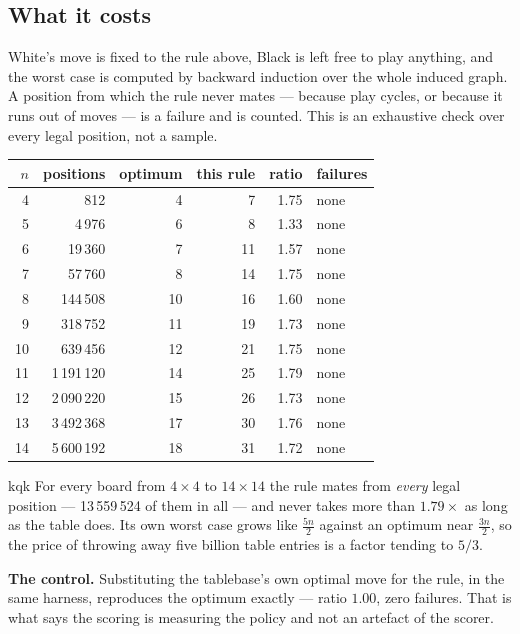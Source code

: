 \documentclass[11pt]{article}
\begin{document}
\subsection{What it costs}\label{sub:rule-cost}

White's move is fixed to the rule above, Black is left free to play anything,
and the worst case is computed by backward induction over the whole induced
graph. A position from which the rule never mates --- because play cycles, or
because it runs out of moves --- is a failure and is counted. This is an
exhaustive check over every legal position, not a sample.

\begin{center}\small
\begin{tabular}{@{}rrrrrl@{}}
\toprule
$n$ & \textbf{positions} & \textbf{optimum} & \textbf{this rule} &
\textbf{ratio} & \textbf{failures} \\
\midrule
 4 &         812 &  4 &  7 & 1.75 & none \\
 5 &     4\,976 &  6 &  8 & 1.33 & none \\
 6 &    19\,360 &  7 & 11 & 1.57 & none \\
 7 &    57\,760 &  8 & 14 & 1.75 & none \\
 8 &   144\,508 & 10 & 16 & 1.60 & none \\
 9 &   318\,752 & 11 & 19 & 1.73 & none \\
10 &   639\,456 & 12 & 21 & 1.75 & none \\
11 & 1\,191\,120 & 14 & 25 & 1.79 & none \\
12 & 2\,090\,220 & 15 & 26 & 1.73 & none \\
13 & 3\,492\,368 & 17 & 30 & 1.76 & none \\
14 & 5\,600\,192 & 18 & 31 & 1.72 & none \\
\bottomrule
\end{tabular}
\end{center}

\begin{result}[title={A rule that mates from everywhere, at most $1.79\times$ the optimum}]{kqk}
For every board from $4\times4$ to $14\times14$ the rule mates from
\emph{every} legal position --- 13\,559\,524 of them in all --- and never takes
more than $1.79\times$ as long as the table does. Its own worst case grows
like $\tfrac{5n}{2}$ against an optimum near $\tfrac{3n}{2}$, so the price of
throwing away five billion table entries is a factor tending to $5/3$.

\medskip
\textbf{The control.} Substituting the tablebase's own optimal move for the
rule, in the same harness, reproduces the optimum exactly --- ratio $1.00$,
zero failures. That is what says the scoring is measuring the policy and not
an artefact of the scorer.
\end{result}
\end{document}
